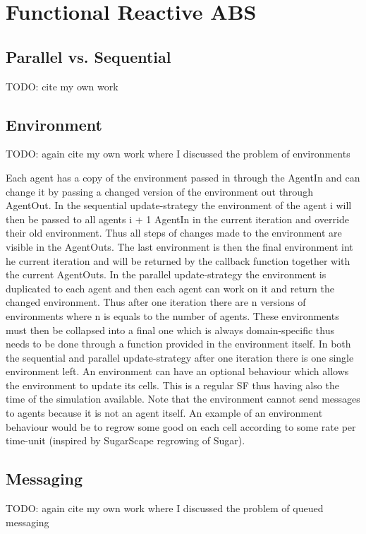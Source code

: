 \section{Functional Reactive ABS}

\subsection{Parallel vs. Sequential}
TODO: cite my own work

\subsection{Environment}
TODO: again cite my own work where I discussed the problem of environments

Each agent has a copy of the environment passed in through the AgentIn and can change it by passing a changed version of the environment out through AgentOut. 
In the sequential update-strategy the environment of the agent i will then be passed to all agents i + 1 AgentIn in the current iteration and override their old environment. Thus all steps of changes made to the environment are visible in the AgentOuts. The last environment is then the final environment int he current iteration and will be returned by the callback function together with the current AgentOuts.
In the parallel update-strategy the environment is duplicated to each agent and then each agent can work on it and return the changed environment. Thus after one iteration there are n versions of environments where n is equals to the number of agents. These environments must then be collapsed into a final one which is always domain-specific thus needs to be done through a function provided in the environment itself.
In both the sequential and parallel update-strategy after one iteration there is one single environment left. An environment can have an optional behaviour which allows the environment to update its cells. This is a regular SF thus having also the time of the simulation available. Note that the environment cannot send messages to agents because it is not an agent itself. An example of an environment behaviour would be to regrow some good on each cell according to some rate per time-unit (inspired by SugarScape regrowing of Sugar).


\subsection{Messaging}
TODO: again cite my own work where I discussed the problem of queued messaging

